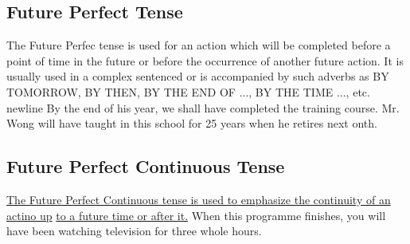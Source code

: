 \subsection{Future Perfect Tense}
The Future Perfec tense is used for an action which will be completed before a
point of time in the future or before the occurrence of another future action.
It is usually used in a complex sentenced or is accompanied by such adverbs as
BY TOMORROW, BY THEN, BY THE END OF ..., BY THE TIME ..., etc.
\newline
newline
By the end of his year, we shall have completed the training course.
\newline
Mr. Wong will have taught in this school for 25 years when he retires next onth.

\subsection{Future Perfect Continuous Tense}
\underline{The Future Perfect Continuous tense is used to emphasize the
continuity of an actino up}
\newline
\underline{to a future time or after it.}
\newline
\newline
When this programme finishes, you will have been watching television for three
whole hours.

